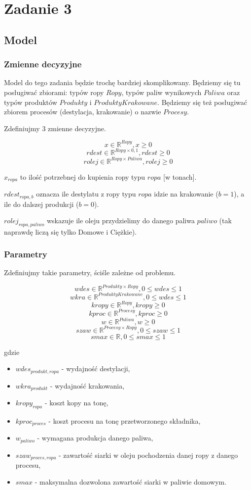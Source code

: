 \documentclass{article}
\theoremstyle{definition}
\theoremstyle{remark}
\theoremstyle{plain}
\theoremstyle{remark}
\theoremstyle{plain}
\begin{document}
\section{Zadanie 3}
\subsection{Model}
\subsubsection{Zmienne decyzyjne}
Model do tego zadania będzie trochę bardziej skomplikowany.
Będziemy się tu posługiwać zbiorami: typów ropy $Ropy$, typów paliw wynikowych $Paliwa$ oraz typów produktów $Produkty$ i $ProduktyKrakowane$.
Będziemy się też posługiwać zbiorem procesów (destylacja, krakowanie) o nazwie $Procesy$.

Zdefiniujmy 3 zmienne decyzyjne.

\[ x \in \mathbb{R}^{Ropy}, x \geq 0 \]
\[ rdest \in \mathbb{R}^{Ropy\times {0,1}}, rdest \geq 0 \]
\[ rolej \in \mathbb{R}^{Ropy\times Paliwa}, rolej \geq 0 \]

$x_{ropa}$ to ilość potrzebnej do kupienia ropy typu $ropa$ [w tonach].

$rdest_{ropa, b}$ oznacza ile destylatu z ropy typu $ropa$ idzie na krakowanie ($b=1$), a ile do dalszej produkcji ($b=0$).

$rolej_{ropa, paliwo}$ wskazuje ile oleju przydzielimy do danego paliwa $paliwo$ (tak naprawdę liczą się tylko Domowe i Ciężkie).

\subsubsection{Parametry}
Zdefiniujmy takie parametry, ściśle zależne od problemu.

\[ wdes \in \mathbb{R}^{Produkty\times Ropy}, 0 \leq wdes \leq 1 \]
\[ wkra \in \mathbb{R}^{ProduktyKrakowane}, 0 \leq wdes \leq 1 \]
\[ kropy \in \mathbb{R}^{Ropy}, kropy \geq 0 \]
\[ kproc \in \mathbb{R}^{Procesy}, kproc \geq 0 \]
\[ w \in \mathbb{R}^{Paliwa}, w \geq 0 \]
\[ szaw \in \mathbb{R}^{Procesy\times Ropy}, 0 \leq szaw \leq 1 \]
\[ smax \in \mathbb{R}, 0 \leq smax \leq 1 \]

gdzie
\begin{itemize}
    \item $wdes_{produkt, ropa}$ - wydajność destylacji,
    \item $wkra_{produkt}$ - wydajność krakowania,
    \item $kropy_{ropa}$ - koszt kopy na tonę,
    \item $kproc_{proces}$ - koszt procesu na tonę przetworzonego składnika,
    \item $w_{paliwo}$ - wymagana produkcja danego paliwa,
    \item $szaw_{proces, ropa}$ - zawartość siarki w oleju pochodzenia danej ropy z danego procesu,
    \item $smax$ - maksymalna dozwolona zawartość siarki w paliwie domowym.
\end{itemize}
\end{document}
